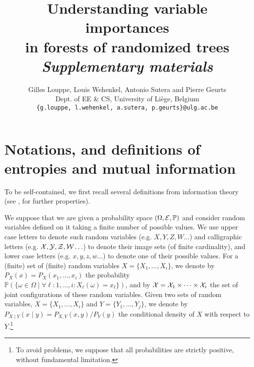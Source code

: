 \documentclass{article}
\title{\textbf{Understanding variable importances\\
in forests of randomized trees\\
\textit{Supplementary materials}}}
\author{
Gilles Louppe, Louis Wehenkel, Antonio Sutera and Pierre Geurts\\
Dept. of EE \& CS, University of Liège, Belgium \\
\texttt{\{g.louppe, l.wehenkel, a.sutera, p.geurts\}@ulg.ac.be}\\
}
\begin{document}
\maketitle
\allowdisplaybreaks




\appendix



\section{Notations, and definitions of entropies and mutual information}

To be self-contained, we first recall several definitions from information theory (see \cite{cover2012elements}, for further properties).

We suppose that we are given a probability space $(\Omega, {\cal E}, \mathbb{P})$ and  consider random variables
defined on it taking a finite number of possible values. We use upper case letters to denote such random variables (e.g. $X, Y, Z, W \ldots$)  and calligraphic letters (e.g. $\cal X, Y, Z, W \ldots$) to denote their image sets (of finite cardinality), and lower case letters (e.g. $x, y, z, w \ldots$) to denote one of their possible values.
For a (finite) set of (finite) random variables $ X = \{X_{1}, \ldots , X_{i}\}$, we denote by $P_{X}(x) = P_{X}(x_{1}, \ldots , x_{i})$ the probability $\mathbb{P}(\{ \omega \in \Omega \mid  \forall \ell : 1, \ldots, i: X_{\ell}(\omega) =x_{\ell}\})$, and by ${\cal X} = {\cal X}_{1} \times \cdots \times {\cal X}_{i}$ the set of joint configurations of these random variables. Given two sets of random variables, $X = \{X_{1}, \ldots , X_{i}\}$ and $Y=\{Y_{1}, \ldots , Y_{j}\}$, we denote by $P_{X \mid Y}(x \mid y) = {P_{X, Y} (x,  y)}/ {P_{Y}(y)}$ the conditional density of $X$ with respect to $Y$.\footnote{To avoid problems, we suppose that all probabilities are strictly positive, without fundamental limitation.}
\end{document}
